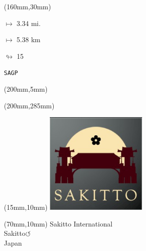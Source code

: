\begin{textblock*}{40mm}(160mm,30mm)%
\Large
\par$\mapsto$ 3.34 mi.
\par$\mapsto$ 5.38 km
\par$\looparrowright$ 15
\par\hfill\tiny\tt SAGP\\
\end{textblock*}
\begin{textblock*}{20mm}(200mm,5mm)%
\fbox{\thepage}
\label{SAGP}
\end{textblock*}
\begin{textblock*}{20mm}(200mm,285mm)%
\fbox{\thepage}
\end{textblock*}

\null\newpage
\begin{textblock*}{50mm}(15mm,10mm)%
\includegraphics[width=50mm]{LG/2015-05-20_00093.png}
\end{textblock*}
\begin{textblock*}{130mm}(70mm,10mm)%
{\fontsize{20}{20}\selectfont Sakitto International\\}
{\fontsize{16}{16}\selectfont Sakitto\hfill \huge$\circlearrowleft$\\}
{\fontsize{12}{12}\selectfont Japan\\}
\end{textblock*}
